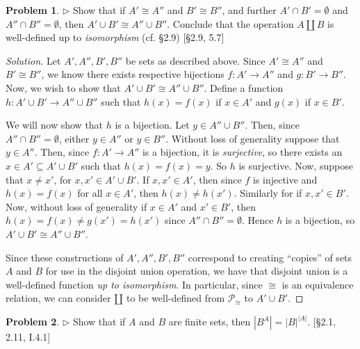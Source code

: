 \documentclass[fontsize=14pt]{scrartcl}
\theoremstyle{definition}
\newtheorem{problem-internal}{Problem}[subsection]
\newenvironment{problem}{
  \medskip
  \begin{problem-internal}
}{
  \end{problem-internal}
}
\newenvironment{solution}{
  \begin{proof}[Solution]
  \vspace{-8px}
  \setlength{\parskip}{4px}
  \setlength{\parindent}{0px}
}{
  \end{proof}
}
\newcommand{\abs}[1]{\left|#1\right|}
\begin{document}
\begin{problem}
$\rhd$ Show that if $A'\cong A''$ and $B'\cong B''$, and further
$A'\cap B'=\emptyset$ and $A''\cap B''=\emptyset$, then $A'\cup B'\cong A''\cup
B''$. Conclude that the operation $A\amalg B$ is well-defined up to
\textit{isomorphism} (cf. \S2.9) [\S2.9, 5.7]
\end{problem}

\begin{solution}
Let $A',A'',B',B''$ be sets as described above. Since $A'\cong A''$ and $B'\cong
B''$, we know there exists respective bijections $f:A'\to A''$ and $g:B'\to
B''$. Now, we wish to show that $A'\cup B'\cong A''\cup B''$. Define a function
$h:A'\cup B'\to A''\cup B''$ such that $h(x) = f(x)$ if $x\in A'$ and $g(x)$ if
$x\in B'$.

We will now show that $h$ is a bijection. Let $y\in A''\cup B''$. Then, since
$A''\cap B''=\emptyset$, either $y\in A''$ or $y\in B''$. Without loss of
generality suppose that $y\in A''$. Then, since $f:A'\to A''$ is a bijection, it
is \textit{surjective}, so there exists an $x\in A'\subseteq A'\cup B'$ such
that $h(x) = f(x) = y$. So $h$ is surjective. Now, suppose that $x\neq x'$, for
$x,x'\in A'\cup B'$. If $x,x'\in A'$, then since $f$ is injective and $h(x) =
f(x)$ for all $x\in A'$, then $h(x)\neq h(x')$. Similarly for if $x,x'\in B'$.
Now, without loss of generality if $x\in A'$ and $x'\in B'$, then $h(x) = f(x)
\neq g(x') = h(x')$ since $A''\cap B''=\emptyset$. Hence $h$ is a bijection, so
$A'\cup B'\cong A''\cup B''$.

Since these constructions of $A',A'',B',B''$ correspond to creating ``copies''
of sets $A$ and $B$ for use in the disjoint union operation, we have that
disjoint union is a well-defined function \textit{up to isomorphism}. In
particular, since $\cong$ is an equivalence relation, we can consider $\amalg$
to be well-defined from $\mathscr{P}_{\cong}$ to $A'\cup B'$.
\end{solution}


\begin{problem}
$\rhd$ Show that if $A$ and $B$ are finite sets, then $\abs{B^A} =
\abs{B}^{\abs{A}}$. [\S2.1, 2.11, I.4.1]
\end{problem}
\end{document}
